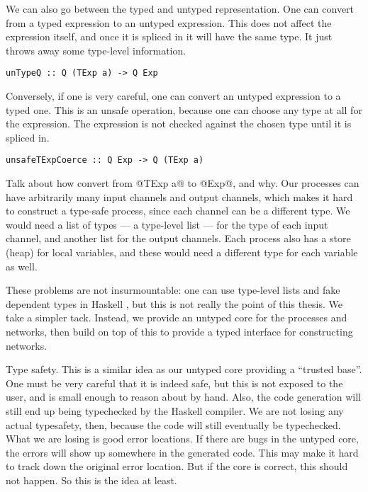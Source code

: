 We can also go between the typed and untyped representation.
One can convert from a typed expression to an untyped expression.
This does not affect the expression itself, and once it is spliced in it will have the same type.
It just throws away some type-level information.

\begin{lstlisting}
unTypeQ :: Q (TExp a) -> Q Exp
\end{lstlisting}

Conversely, if one is very careful, one can convert an untyped expression to a typed one.
This is an unsafe operation, because one can choose any type at all for the expression.
The expression is not checked against the chosen type until it is spliced in.
\begin{lstlisting}
unsafeTExpCoerce :: Q Exp -> Q (TExp a)
\end{lstlisting}

Talk about how convert from @TExp a@ to @Exp@, and why.
Our processes can have arbitrarily many input channels and output channels, which makes it hard to construct a type-safe process, since each channel can be a different type.
We would need a list of types --- a type-level list --- for the type of each input channel, and another list for the output channels.
Each process also has a store (heap) for local variables, and these would need a different type for each variable as well.

These problems are not insurmountable: one can use type-level lists and fake dependent types in Haskell \CITE, but this is not really the point of this thesis.
We take a simpler tack.
Instead, we provide an untyped core for the processes and networks, then build on top of this to provide a typed interface for constructing networks.

Type safety.
This is a similar idea as our untyped core providing a ``trusted base''.
One must be very careful that it is indeed safe, but this is not exposed to the user, and is small enough to reason about by hand.
Also, the code generation will still end up being typechecked by the Haskell compiler.
We are not losing any actual typesafety, then, because the code will still eventually be typechecked.
What we are losing is good error locations. If there are bugs in the untyped core, the errors will show up somewhere in the generated code.
This may make it hard to track down the original error location.
But if the core is correct, this should not happen.
So this is the idea at least.



